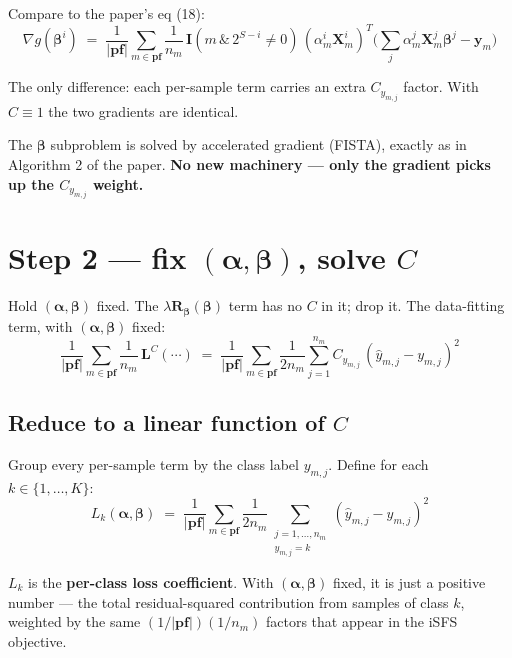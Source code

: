 \documentclass[11pt,a4paper]{article}
\begin{document}
Compare to the paper's eq (18):
\[
\nabla g(\boldsymbol{\beta}^{i}) \;=\; \frac{1}{|\mathbf{pf}|}\sum_{m \in \mathbf{pf}}\frac{1}{n_m}\,\mathbf{I}\!\left(m\,\&\,2^{S-i}\neq 0\right)\,(\alpha^{i}_{m}\mathbf{X}^{i}_{m})^{T}\!\Big(\sum_{j}\alpha^{j}_{m}\mathbf{X}^{j}_{m}\boldsymbol{\beta}^{j} - \mathbf{y}_m\Big)
\]

The only difference: each per-sample term carries an extra $C_{y_{m,j}}$ factor. With $C \equiv 1$ the two gradients are identical. \checkmark

The $\boldsymbol{\beta}$ subproblem is solved by accelerated gradient (FISTA), exactly as in Algorithm 2 of the paper. \textbf{No new machinery --- only the gradient picks up the $C_{y_{m,j}}$ weight.}

\section{Step 2 --- fix $(\boldsymbol{\alpha}, \boldsymbol{\beta})$, solve $C$}

Hold $(\boldsymbol{\alpha}, \boldsymbol{\beta})$ fixed. The $\lambda \mathbf{R}_{\boldsymbol{\beta}}(\boldsymbol{\beta})$ term has no $C$ in it; drop it. The data-fitting term, with $(\boldsymbol{\alpha}, \boldsymbol{\beta})$ fixed:
\[
\frac{1}{|\mathbf{pf}|}\sum_{m \in \mathbf{pf}}\frac{1}{n_m}\,\mathbf{L}^{C}(\cdots) \;=\; \frac{1}{|\mathbf{pf}|}\sum_{m \in \mathbf{pf}}\frac{1}{2 n_m}\sum_{j=1}^{n_m} C_{y_{m,j}}\,(\hat{y}_{m,j} - y_{m,j})^{2}
\]

\subsection{Reduce to a linear function of $C$}

Group every per-sample term by the class label $y_{m,j}$. Define for each $k \in \{1, \ldots, K\}$:
\begin{equation}
\boxed{\;L_k(\boldsymbol{\alpha},\boldsymbol{\beta}) \;=\; \frac{1}{|\mathbf{pf}|}\sum_{m \in \mathbf{pf}}\frac{1}{2 n_m}\!\!\sum_{\substack{j=1,\ldots,n_m \\ y_{m,j} = k}}\!\!(\hat{y}_{m,j} - y_{m,j})^{2}\;}
\end{equation}

$L_k$ is the \textbf{per-class loss coefficient}. With $(\boldsymbol{\alpha}, \boldsymbol{\beta})$ fixed, it is just a positive number --- the total residual-squared contribution from samples of class $k$, weighted by the same $(1/|\mathbf{pf}|)(1/n_m)$ factors that appear in the iSFS objective.
\end{document}
